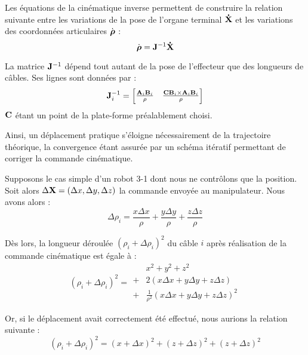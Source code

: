 Les équations de la cinématique inverse permettent de construire la relation suivante entre les variations de la pose de l'organe terminal ${\bf \dot X}$ et les variations des coordonnées articulaires ${\dot {\hbox{\boldmath $\rho$}}}$ :
\begin{equation}
  \dot {\hbox{\boldmath $\rho$}} = {\bf J}^{-1} {\bf \dot X} 
 \label{chap02:eq0}
\end{equation}

La matrice ${\bf J}^{-1}$ dépend tout autant de la pose de l'effecteur que des longueurs de câbles. Ses lignes sont données par :
\begin{equation}
  {\bf J}^{-1}_i = \begin{bmatrix}
                   \frac {{\bf A}_i {\bf B}_i} \rho & \frac {{\bf C}{\bf B}_i \times {\bf A}_i {\bf B}_i} \rho
                   \end{bmatrix}
 \label{chap02:eq1}
\end{equation}
${\bf C}$ étant un point de la plate-forme préalablement choisi.

Ainsi, un déplacement pratique s'éloigne nécessairement de la trajectoire théorique, la convergence étant assurée par un schéma itératif permettant de corriger la commande cinématique.

Supposons le cas simple d'un robot 3-1 dont nous ne contrôlons que la position. Soit alors $\Delta {\bf X} = (\Delta x, \Delta y, \Delta z)$ la commande envoyée au manipulateur.  Nous avons alors :
\begin{equation}
  \Delta \rho_i = \frac {x \Delta x} \rho + \frac {y \Delta y} \rho + \frac {z \Delta z} \rho  
 \label{chap02:eq2}
\end{equation}

Dès lors, la longueur déroulée $(\rho_i + \Delta \rho_i)^2$ du câble $i$ après réalisation de la commande cinématique est égale à :
\begin{equation}
  (\rho_i + \Delta \rho_i)^2 = \begin{matrix}
                                & x^2 + y^2 + z^2 \\
                                + & 2 (x \Delta x + y \Delta y + z \Delta z)\\
                                + &  \frac 1 {\rho^2} (x \Delta x + y \Delta y + z \Delta z)^2
                               \end{matrix}
 \label{chap02:eq3}
\end{equation}

Or, si le déplacement avait correctement été effectué, nous aurions la relation suivante :
\begin{equation}
  (\rho_i + \Delta \rho_i)^2 = (x + \Delta x)^2 + (z + \Delta z)^2 + (z + \Delta z)^2 
 \label{chap02:eq4}
\end{equation}

